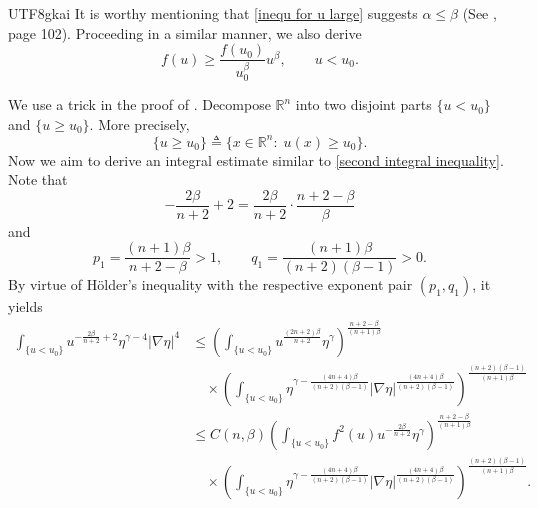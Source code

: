 \documentclass[reqno,12pt]{amsart}
\numberwithin{equation}{section}
\newcommand{\bR}{{\mathbb R}}  %
\begin{document}
\begin{CJK}{UTF8}{gkai}
   	   It is worthy mentioning that \eqref{inequ for u large} suggests $\alpha\le \beta$ (See \cite{SZ}, page 102). Proceeding in a similar manner, we also derive 
   	   \begin{equation}\label{inequ for u small}
   	    f(u)\ge \frac{f(u_{0})}{u_{0}^{\beta}}u^{\beta},\qquad u< u_{0}.
   	   \end{equation}
   	   
   	    We use a trick in the proof of \cite[Theorem 2.8]{he2025optimalliouvilletheoremslaneemden}. Decompose $\bR^{n}$ into two disjoint parts $\{u<u_{0}\}$ and $\{u\ge u_{0}\}$. More precisely,
   	    \begin{equation*}
   	    	\{u\ge u_{0}\}\triangleq \{x\in \bR^{n}:\; u(x)\ge u_{0}\}.
   	    \end{equation*}
   	    Now we aim to derive an integral estimate similar to \eqref{second integral inequality}. Note that
   	    $$ -\frac{2\beta}{n+2}+2=\frac{2\beta}{n+2}\cdot \frac{n+2-\beta}{\beta}$$
   	    and 
   	    \begin{equation*}
   	    	p_{1}=\frac{(n+1)\beta}{n+2-\beta}>1,\qquad q_{1}=\frac{(n+1)\beta}{(n+2)(\beta-1)}>0.
   	    \end{equation*}
   	    By virtue of H\"{o}lder's inequality with the respective exponent pair $(p_{1},q_{1})$, it yields 
   	    \begin{equation}\label{estimate for small}
   	    	\begin{aligned}
   	    		\int_{\{u<u_{0}\}} u^{-\frac{2\beta}{n+2}+2} \eta^{\gamma-4} |\nabla\eta|^{4}
   	    		&\le \left( \int_{\{u<u_{0}\}} u^{\frac{(2n+2)\beta}{n+2}} \eta^{\gamma} \right)^{\frac{n+2-\beta}{(n+1)\beta}} \\
   	    		&\quad \times \left( \int_{\{u<u_{0}\}} \eta^{\gamma-\frac{(4n+4)\beta}{(n+2)(\beta-1)}} |\nabla \eta|^{\frac{(4n+4)\beta}{(n+2)(\beta-1)}} \right)^{\frac{(n+2)(\beta-1)}{(n+1)\beta}} \\
   	    		&\le C(n,\beta) \left( \int_{\{u<u_{0}\}} f^{2}(u) u^{-\frac{2\beta}{n+2}} \eta^{\gamma} \right)^{\frac{n+2-\beta}{(n+1)\beta}} \\
   	    		&\quad \times \left( \int_{\{u<u_{0}\}} \eta^{\gamma-\frac{(4n+4)\beta}{(n+2)(\beta-1)}} |\nabla \eta|^{\frac{(4n+4)\beta}{(n+2)(\beta-1)}} \right)^{\frac{(n+2)(\beta-1)}{(n+1)\beta}}. \\
   	    	\end{aligned}
   	    \end{equation}

\end{CJK}
\end{document}
